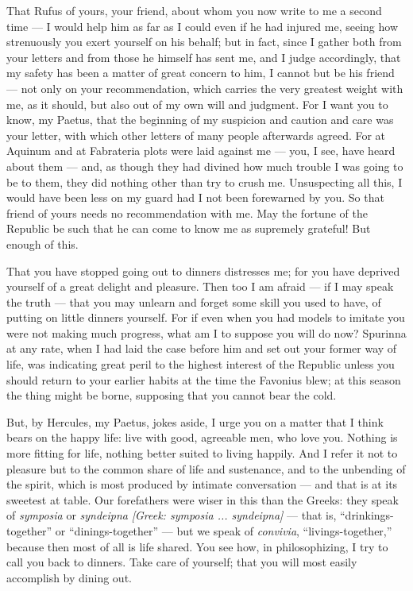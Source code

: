 

 That Rufus of yours, your friend, about whom you now write to me a second time --- I would help him as far as I could even if he had injured me, seeing how strenuously you exert yourself on his behalf; but in fact, since I gather both from your letters and from those he himself has sent me, and I judge accordingly, that my safety has been a matter of great concern to him, I cannot but be his friend --- not only on your recommendation, which carries the very greatest weight with me, as it should, but also out of my own will and judgment. For I want you to know, my Paetus, that the beginning of my suspicion and caution and care was your letter, with which other letters of many people afterwards agreed. For at Aquinum and at Fabrateria plots were laid against me --- you, I see, have heard about them --- and, as though they had divined how much trouble I was going to be to them, they did nothing other than try to crush me. Unsuspecting all this, I would have been less on my guard had I not been forewarned by you. So that friend of yours needs no recommendation with me. May the fortune of the Republic be such that he can come to know me as supremely grateful! But enough of this.

 That you have stopped going out to dinners distresses me; for you have deprived yourself of a great delight and pleasure. Then too I am afraid --- if I may speak the truth --- that you may unlearn and forget some skill you used to have, of putting on little dinners yourself. For if even when you had models to imitate you were not making much progress, what am I to suppose you will do now? Spurinna at any rate, when I had laid the case before him and set out your former way of life, was indicating great peril to the highest interest of the Republic unless you should return to your earlier habits at the time the Favonius blew; at this season the thing might be borne, supposing that you cannot bear the cold.

 But, by Hercules, my Paetus, jokes aside, I urge you on a matter that I think bears on the happy life: live with good, agreeable men, who love you. Nothing is more fitting for life, nothing better suited to living happily. And I refer it not to pleasure but to the common share of life and sustenance, and to the unbending of the spirit, which is most produced by intimate conversation --- and that is at its sweetest at table. Our forefathers were wiser in this than the Greeks: they speak of \textit{symposia} or \textit{syndeipna} \textit{[Greek: symposia ... syndeipna]} --- that is, ``drinkings-together'' or ``dinings-together'' --- but we speak of \textit{convivia}, ``livings-together,'' because then most of all is life shared. You see how, in philosophizing, I try to call you back to dinners. Take care of yourself; that you will most easily accomplish by dining out.

